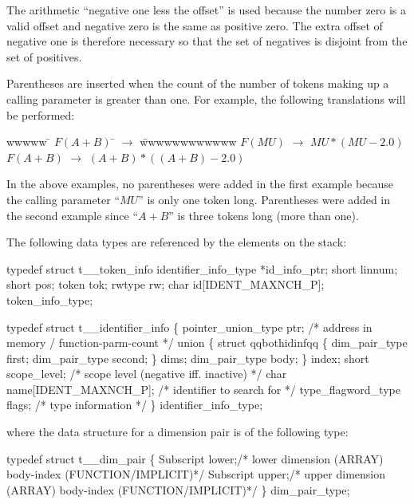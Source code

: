 The arithmetic ``negative one less the offset'' is used because the number
zero is a valid offset and negative zero is the same as positive zero.   The
extra offset of negative one is therefore necessary so that the set of
negatives is disjoint from the set of positives.

Parentheses are inserted when the count of the number of tokens making up
a calling parameter is greater than one.   For example, the following
translations will be performed:
\begin{typedef_tabbing}
wwwww \= $F(A+B)$ \= $\longrightarrow$ \= wwwwwwwwwwww \kill
\> $F(MU)$ \> $\longrightarrow$ \> $MU*(MU-2.0)$ \\
\> $F(A+B)$ \> $\longrightarrow$ \> $(A+B)*((A+B)-2.0)$  \\
\end{typedef_tabbing}

In the above examples, no parentheses were added in the first example because
the calling parameter ``$MU$'' is only one token long.  Parentheses were added
in the second example since ``$A+B$'' is three tokens long (more than one).

The following data types are referenced by the elements on the stack:
\begin{codeexample}
typedef struct t__token_info
   {
      identifier_info_type *id_info_ptr;
      short linnum;
      short pos;
      token tok;
      rwtype rw;
      char id[IDENT_MAXNCH_P];
   } token_info_type;
\end{codeexample}

\begin{codeexample}
typedef struct t__identifier_info
  \{
     pointer_union_type ptr;    /* address in memory / function-parm-count */
     union
        \{
           struct qqbothidinfqq
              \{
                 dim_pair_type first;
                 dim_pair_type second;
              \} dims;
           dim_pair_type body;
        \} index;
     short scope_level;         /* scope level (negative iff. inactive) */
     char name[IDENT_MAXNCH_P]; /* identifier to search for */
     type_flagword_type flags;  /* type information */
  \} identifier_info_type;
\end{codeexample}
where the data structure for a dimension pair is of the following type:
\begin{codeexample}
typedef struct t__dim_pair
  \{
    Subscript lower;/* lower dimension (ARRAY) body-index (FUNCTION/IMPLICIT)*/
    Subscript upper;/* upper dimension (ARRAY) body-index (FUNCTION/IMPLICIT)*/
  \} dim_pair_type;
\end{codeexample}

